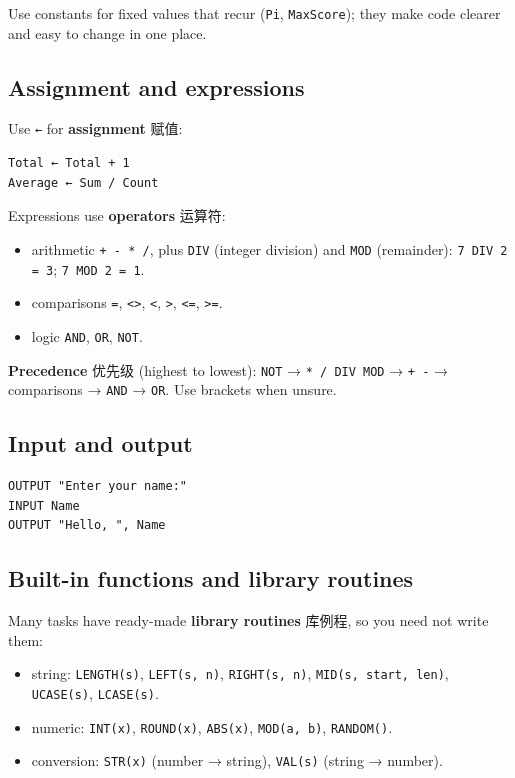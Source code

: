 \documentclass[11pt]{article}
\begin{document}
Use constants for fixed values that recur (\texttt{Pi}, \texttt{MaxScore}); they make code clearer and easy to change in one place.

\subsection*{Assignment and expressions}

Use \texttt{←} for \textbf{assignment} 赋值:

\begin{Verbatim}
Total ← Total + 1
Average ← Sum / Count
\end{Verbatim}

Expressions use \textbf{operators} 运算符:

\begin{itemize}
\item arithmetic \texttt{+ - * /}, plus \texttt{DIV} (integer division) and \texttt{MOD} (remainder): \texttt{7 DIV 2 = 3}; \texttt{7 MOD 2 = 1}.

\item comparisons \texttt{=}, \texttt{\textless{}\textgreater{}}, \texttt{\textless{}}, \texttt{\textgreater{}}, \texttt{\textless{}=}, \texttt{\textgreater{}=}.

\item logic \texttt{AND}, \texttt{OR}, \texttt{NOT}.

\end{itemize}

\textbf{Precedence} 优先级 (highest to lowest): \texttt{NOT} → \texttt{* / DIV MOD} → \texttt{+ -} → comparisons → \texttt{AND} → \texttt{OR}. Use brackets when unsure.

\subsection*{Input and output}

\begin{Verbatim}
OUTPUT "Enter your name:"
INPUT Name
OUTPUT "Hello, ", Name
\end{Verbatim}

\subsection*{Built-in functions and library routines}

Many tasks have ready-made \textbf{library routines} 库例程, so you need not write them:

\begin{itemize}
\item string: \texttt{LENGTH(s)}, \texttt{LEFT(s, n)}, \texttt{RIGHT(s, n)}, \texttt{MID(s, start, len)}, \texttt{UCASE(s)}, \texttt{LCASE(s)}.

\item numeric: \texttt{INT(x)}, \texttt{ROUND(x)}, \texttt{ABS(x)}, \texttt{MOD(a, b)}, \texttt{RANDOM()}.

\item conversion: \texttt{STR(x)} (number → string), \texttt{VAL(s)} (string → number).

\end{itemize}
\end{document}
